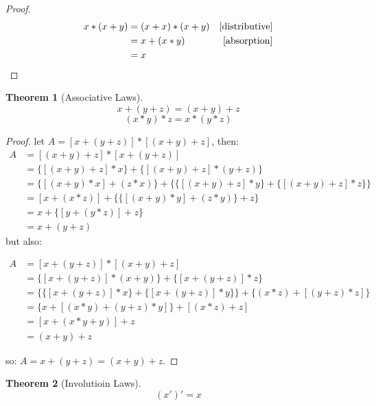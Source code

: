 \documentclass{article}
\newtheorem{theorem}{Theorem}[section]
\begin{document}
\begin{proof}
\begin{align*}
x * (x + y) & = (x + x) * (x + y) & \ref{distributive} \\
            & = x + (x * y)       & \ref{absorption} \\
            & = x
\end{align*}
\end{proof}

\newpage

\begin{theorem}[Associative Laws]
\label{associative}
\[ x + (y + z) = (x + y) + z \]
\[ (x * y) * z = x * (y * z) \]
\end{theorem}

\begin{proof}
let $A = [x + (y + z)] * [(x + y) + z]$, then:
\begin{align*}
A & = [(x + y) + z] * [x + (y + z)] \\
  & = \{[(x + y) + z] * x\} + \{[(x + y) + z] * (y + z)\} \\
  & = \{[(x + y) * x] + (z * x)\} + \{ \{[(x + y) + z] * y\} + \{[(x + y) + z] * z\} \} \\
  & = [x + (x * z)] + \{\{[(x + y) * y] + (z * y)\} + z\} \\
  & = x + \{[y + (y * z)] + z\} \\
  & = x + (y + z)
\end{align*}
but also:

\begin{align*}
A & = [x + (y + z)] * [(x + y) + z] \\
  & = \{[x + (y + z)] * (x + y)\} + \{[x + (y + z)] * z\} \\
  & = \{\{[x + (y + z)] * x\} + \{[x + (y + z)] * y\}\} + \{(x * z) + [(y + z) * z]\}\\
  & = \{x + [(x * y) + (y + z) * y]\} + [(x * z) + z]\\
  & = [x + (x * y + y)] + z\\
  & = (x + y) + z
\end{align*}

so: $A = x + (y + z) = (x + y) + z$.
\end{proof}

\newpage
\begin{theorem}[Involutioin Laws]
\label{involutioin}
\[ (x')' = x \]
\end{theorem}
\end{document}
